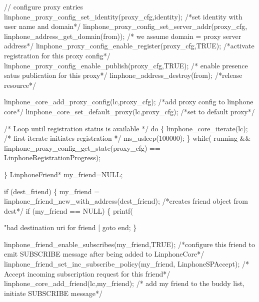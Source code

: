 \begin{DoxyCodeInclude}
{{{{                \textcolor{comment}{// configure proxy entries}
                linphone_proxy_config_set_identity(proxy\_cfg,identity); \textcolor{comment}{/*set identity with user name and
       domain*/}
                linphone_proxy_config_set_server_addr(proxy\_cfg,
      linphone_address_get_domain(from)); \textcolor{comment}{/* we assume domain = proxy server address*/}
                linphone_proxy_config_enable_register(proxy\_cfg,TRUE); \textcolor{comment}{/*activate registration for this
       proxy config*/}
                linphone_proxy_config_enable_publish(proxy\_cfg,TRUE); \textcolor{comment}{/* enable presence satus publication
       for this proxy*/}
                linphone_address_destroy(from); \textcolor{comment}{/*release resource*/}

                linphone_core_add_proxy_config(lc,proxy\_cfg); \textcolor{comment}{/*add proxy config to linphone core*/}
                linphone_core_set_default_proxy(lc,proxy\_cfg); \textcolor{comment}{/*set to default proxy*/}


                \textcolor{comment}{/* Loop until registration status is available */}
                \textcolor{keywordflow}{do} \{
                        linphone_core_iterate(lc); \textcolor{comment}{/* first iterate initiates registration */}
                        ms\_usleep(100000);
                \}
                \textcolor{keywordflow}{while}(  running && linphone\_proxy\_config\_get\_state(proxy\_cfg) == 
      LinphoneRegistrationProgress);

        \}
        LinphoneFriend* my\_friend=NULL;

        \textcolor{keywordflow}{if} (dest\_friend) \{
                my\_friend = linphone_friend_new_with_address(dest\_friend); \textcolor{comment}{/*creates friend object from
       dest*/}
                \textcolor{keywordflow}{if} (my\_friend == NULL) \{
                        printf(\textcolor{stringliteral}{"bad destination uri for friend [%
                        \textcolor{keywordflow}{goto} end;
                \}

                linphone_friend_enable_subscribes(my\_friend,TRUE); \textcolor{comment}{/*configure this friend to emit
       SUBSCRIBE message after being added to LinphoneCore*/}
                linphone_friend_set_inc_subscribe_policy(my\_friend,
      LinphoneSPAccept); \textcolor{comment}{/* Accept incoming subscription request for this friend*/}
                linphone_core_add_friend(lc,my\_friend); \textcolor{comment}{/* add my friend to the buddy list, initiate
       SUBSCRIBE message*/}

}}}}}
\end{DoxyCodeInclude}
